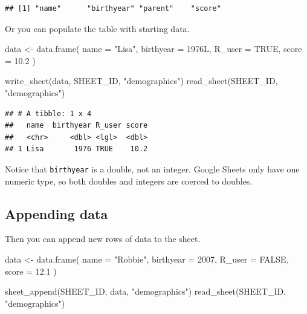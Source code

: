 \documentclass[
]{book}
\newenvironment{Shaded}{\begin{snugshade}}{\end{snugshade}}
\newcommand{\AttributeTok}[1]{\textcolor[rgb]{0.77,0.63,0.00}{#1}}
\newcommand{\ConstantTok}[1]{\textcolor[rgb]{0.00,0.00,0.00}{#1}}
\newcommand{\DecValTok}[1]{\textcolor[rgb]{0.00,0.00,0.81}{#1}}
\newcommand{\FloatTok}[1]{\textcolor[rgb]{0.00,0.00,0.81}{#1}}
\newcommand{\FunctionTok}[1]{\textcolor[rgb]{0.00,0.00,0.00}{#1}}
\newcommand{\NormalTok}[1]{#1}
\newcommand{\OtherTok}[1]{\textcolor[rgb]{0.56,0.35,0.01}{#1}}
\newcommand{\StringTok}[1]{\textcolor[rgb]{0.31,0.60,0.02}{#1}}
\begin{document}
\begin{verbatim}
## [1] "name"      "birthyear" "parent"    "score"
\end{verbatim}

Or you can populate the table with starting data.

\begin{Shaded}
\begin{Highlighting}[]
\NormalTok{data }\OtherTok{\textless{}{-}} \FunctionTok{data.frame}\NormalTok{(}
  \AttributeTok{name =} \StringTok{"Lisa"}\NormalTok{,}
  \AttributeTok{birthyear =}\NormalTok{ 1976L,}
  \AttributeTok{R\_user =} \ConstantTok{TRUE}\NormalTok{,}
  \AttributeTok{score =} \FloatTok{10.2}
\NormalTok{)}

\FunctionTok{write\_sheet}\NormalTok{(data, SHEET\_ID, }\StringTok{"demographics"}\NormalTok{)}
\FunctionTok{read\_sheet}\NormalTok{(SHEET\_ID, }\StringTok{"demographics"}\NormalTok{)}
\end{Highlighting}
\end{Shaded}

\begin{verbatim}
## # A tibble: 1 x 4
##   name  birthyear R_user score
##   <chr>     <dbl> <lgl>  <dbl>
## 1 Lisa       1976 TRUE    10.2
\end{verbatim}

Notice that \texttt{birthyear} is a double, not an integer. Google Sheets only have one numeric type, so both doubles and integers are coerced to doubles.

\hypertarget{appending-data}{%
\subsection{Appending data}\label{appending-data}}

Then you can append new rows of data to the sheet.

\begin{Shaded}
\begin{Highlighting}[]
\NormalTok{data }\OtherTok{\textless{}{-}} \FunctionTok{data.frame}\NormalTok{(}
  \AttributeTok{name =} \StringTok{"Robbie"}\NormalTok{,}
  \AttributeTok{birthyear =} \DecValTok{2007}\NormalTok{,}
  \AttributeTok{R\_user =} \ConstantTok{FALSE}\NormalTok{,}
  \AttributeTok{score =} \FloatTok{12.1}
\NormalTok{)}

\FunctionTok{sheet\_append}\NormalTok{(SHEET\_ID, data, }\StringTok{"demographics"}\NormalTok{)}
\FunctionTok{read\_sheet}\NormalTok{(SHEET\_ID, }\StringTok{"demographics"}\NormalTok{)}
\end{Highlighting}
\end{Shaded}
\end{document}
